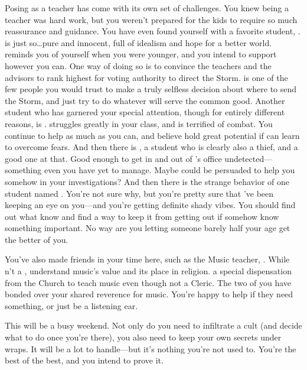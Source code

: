 \documentclass[char]{GL2020}
\begin{document}
Posing as a teacher has come with its own set of challenges. You knew being a teacher was hard work, but you weren't prepared for the kids to require so much reassurance and guidance. You have even found yourself with a favorite student, \cDisney{\full}. \cDisney{} is just so\ldots{}pure and innocent, full of idealism and hope for a better world. \cDisney{\They} reminds you of yourself when you were younger, and you intend to support \cDisney{\them} however you can. One way of doing so is to convince the \pTech{} teachers and the \pFarm{} advisors to rank \cDisney{} highest for voting authority to direct the Storm. \cDisney{} is one of the few people you would trust to make a truly selfless decision about where to send the Storm, and just try to do whatever will serve the common good. Another student who has garnered your special attention, though for entirely different reasons, is \cAdopted{\full}. \cAdopted{} struggles greatly in your class, and is terrified of combat. You continue to help \cAdopted{\them} as much as you can, and believe \cAdopted{\they} hold great potential if \cAdopted{\they} can learn to overcome \cAdopted{\their} fears. And then there is \cPirateChild{\full}, a student who is clearly also a thief, and a good one at that. Good enough to get in and out of \cChupInventor{}'s office undetected---something even you have yet to manage. Maybe \cPirateChild{} could be persuaded to help you somehow in your investigations? And then there is the strange behavior of one \pFarm{} student named \cLibAssist{\full}. You're not sure why, but you're pretty sure that \cLibAssist{\they}'ve been keeping an eye on you---and you're getting definite shady vibes. You should find out what \cLibAssist{\they} know\cLibAssist{\plural} and find a way to keep it from getting out if \cLibAssist{} somehow know\cLibAssist{\plural} something important. No way are you letting someone barely half your age get the better of you.

You've also made friends in your time here, such as the Music teacher, \cMusic{\full}. While \cMusic{\theyare}n't a \cMusic{\cleric} \cMusic{\themself}, \cMusic{\they} understand\cMusic{\plural} music's value and its place in religion. \cMusic{\They} \cMusic{\have} a special dispensation from the Church to teach music even though \cMusic{\theyare} not a Cleric. The two of you have bonded over your shared reverence for music. You're happy to help \cMusic{\them} if they need something, or just be a listening ear.

This will be a busy weekend. Not only do you need to infiltrate a cult (and decide what to do once you're there), you also need to keep your own secrets under wraps. It will be a lot to handle---but it's nothing you're not used to. You're the best of the best, and you intend to prove it.
\end{document}
